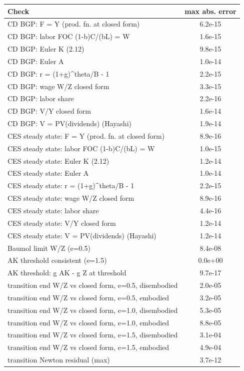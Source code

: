 \begin{tabular}{lc}\toprule Check & max abs. error\\\midrule
CD BGP: F = Y (prod. fn. at closed form) & 6.2e-15\\
CD BGP: labor FOC (1-b)C/(bL) = W & 1.6e-15\\
CD BGP: Euler K (2.12) & 9.8e-15\\
CD BGP: Euler A & 1.0e-14\\
CD BGP: r = (1+g)^theta/B - 1 & 2.2e-15\\
CD BGP: wage W/Z closed form & 3.3e-15\\
CD BGP: labor share & 2.2e-16\\
CD BGP: V/Y closed form & 1.6e-14\\
CD BGP: V = PV(dividends) (Hayashi) & 1.9e-14\\
CES steady state: F = Y (prod. fn. at closed form) & 8.9e-16\\
CES steady state: labor FOC (1-b)C/(bL) = W & 1.0e-15\\
CES steady state: Euler K (2.12) & 1.2e-14\\
CES steady state: Euler A & 1.0e-14\\
CES steady state: r = (1+g)^theta/B - 1 & 2.2e-15\\
CES steady state: wage W/Z closed form & 8.9e-16\\
CES steady state: labor share & 4.4e-16\\
CES steady state: V/Y closed form & 1.2e-14\\
CES steady state: V = PV(dividends) (Hayashi) & 1.2e-14\\
Baumol limit W/Z (e=0.5) & 8.4e-08\\
AK threshold consistent (e=1.5) & 0.0e+00\\
AK threshold: g AK - g Z at threshold & 9.7e-17\\
transition end W/Z vs closed form, e=0.5, disembodied & 2.0e-05\\
transition end W/Z vs closed form, e=0.5, embodied & 3.2e-05\\
transition end W/Z vs closed form, e=1.0, disembodied & 5.3e-05\\
transition end W/Z vs closed form, e=1.0, embodied & 8.8e-05\\
transition end W/Z vs closed form, e=1.5, disembodied & 3.1e-04\\
transition end W/Z vs closed form, e=1.5, embodied & 4.9e-04\\
transition Newton residual (max) & 3.7e-12\\
\bottomrule\end{tabular}
